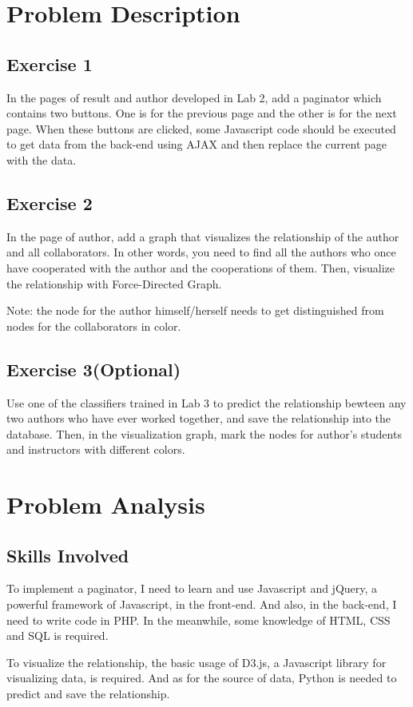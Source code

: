 \documentclass[a4paper]{article}
\begin{document}
    \tableofcontents
    \newpage
    \section{Problem Description}
        \subsection{Exercise 1}
In the pages of result and author developed in Lab 2, add a paginator which contains two buttons. 
One is for the previous page and the other is for the next page. When these buttons are clicked, some 
Javascript code should be executed to get data from the back-end using AJAX and then replace the current 
page with the data. 
        \subsection{Exercise 2}
In the page of author, add a graph that visualizes the relationship of the author and all collaborators.
In other words, you need to find all the authors who once have cooperated with the author and the cooperations of them. Then, visualize the relationship with Force-Directed Graph. 

Note: the node for the author himself/herself needs to get distinguished from nodes for the collaborators in color. 
        \subsection{Exercise 3(Optional)}
Use one of the classifiers trained in Lab 3 to predict the relationship bewteen any two authors who have ever worked together, and save the relationship into the database. Then, in the visualization graph, mark the nodes for author's students and instructors with different colors.
    \newpage
    \section{Problem Analysis}
        \subsection{Skills Involved}
To implement a paginator, I need to learn and use Javascript and jQuery, a powerful framework of Javascript, in the front-end. And also, in the back-end, I need to write code in PHP. In the meanwhile, some knowledge of HTML, CSS and SQL is required.

To visualize the relationship, the basic usage of D3.js, a Javascript library for visualizing data, is required. And as for the source of data, Python is needed to predict and save the relationship.
\end{document}
